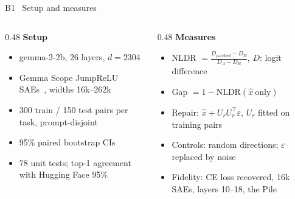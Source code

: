 \documentclass[aspectratio=169,10pt]{beamer}
\begin{document}
\begin{frame}{B1 \textperiodcentered\ Setup and measures}
  \small
  \begin{columns}[T]
    \begin{column}{0.48\textwidth}
      \textbf{Setup}
      \begin{itemize}\setlength{\itemsep}{2pt}
        \item gemma-2-2b, 26 layers, $d = 2304$
        \item Gemma Scope JumpReLU SAEs~\citep{rajamanoharan2024jumping}, widths 16k--262k
        \item 300 train / 150 test pairs per task, prompt-disjoint
        \item 95\% paired bootstrap CIs
        \item 78 unit tests; top-1 agreement with Hugging Face 95\%
      \end{itemize}
    \end{column}
    \begin{column}{0.48\textwidth}
      \textbf{Measures}
      \begin{itemize}\setlength{\itemsep}{2pt}
        \item NLDR $= \frac{D_{\text{patched}} - D_B}{D_A - D_B}$, $D$: logit difference
        \item Gap $= 1 - \text{NLDR}(\hat{x}\ \text{only})$
        \item Repair: $\hat{x} + U_rU_r^{\top}\varepsilon$, $U_r$ fitted on training pairs
        \item Controls: random directions; $\varepsilon$ replaced by noise
        \item Fidelity: CE loss recovered, 16k SAEs, layers 10--18, the Pile
      \end{itemize}
    \end{column}
  \end{columns}
\end{frame}
\end{document}
